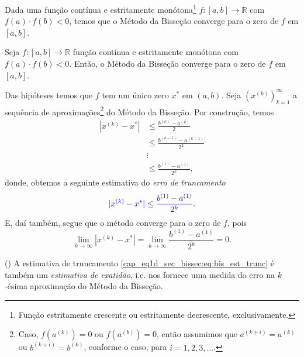 Dada uma função contínua e estritamente monótona\footnote{Função estritamente crescente ou estritamente decrescente, exclusivamente.} $f:[a, b]\to\mathbb{R}$ com $f(a)\cdot f(b) < 0$, temos que o Método da Bisseção converge para o zero de $f$ em $[a, b]$.

\begin{teo}\label{cap_eq1d_sec_bissec:teo:bissece}
  Seja $f:[a, b]\to\mathbb{R}$ função contínua e estritamente monótona com $f(a)\cdot f(b) < 0$. Então, o Método da Bisseção converge para o zero de $f$ em $[a, b]$.
\end{teo}
\begin{dem}
  Das hipóteses temos que $f$ tem um único zero $x^*$ em $(a, b)$. Seja $(x^{(k)})_{k=1}^\infty$ a sequência de aproximações\footnote{Caso, $f\left(a^{(k)}\right)=0$ ou $f\left(a^{(b)}\right)=0$, então assumimos que $a^{(k+i)} = a^{(k)}$ ou $b^{(k+i)} = b^{(k)}$, conforme o caso, para $i=1,2,3,\ldots$.} do Método da Bisseção. Por construção, temos
  \begin{align}
    |x^{(k)} - x^{*}| &\leq \frac{b^{(k)}-a^{(k)}}{2}\\
                      &\leq \frac{b^{(k-1)}-a^{(k-1)}}{2^2}\\
                      &\vdots \\
                      &\leq \frac{b^{(1)}-a^{(1)}}{2^k},
  \end{align}
  donde, obtemos a seguinte estimativa do \emph{erro de truncamento}
  \begin{equation}\label{cap_eq1d_sec_bissec:eq:bis_est_trunc}
    {\color{blue}|x^{(k)} - x^{*}| \leq \frac{b^{(1)}-a^{(1)}}{2^k}}.
  \end{equation}
  E, daí também, segue que o método converge para o zero de $f$, pois
  \begin{equation}
    \lim_{k\to\infty} |x^{(k)}-x^{*}| = \lim_{k\to\infty} \frac{b^{(1)}-a^{(1)}}{2^k} = 0.
  \end{equation}
\end{dem}

\begin{obs}()
  A estimativa de truncamento \ref{cap_eq1d_sec_bissec:eq:bis_est_trunc} é também um \emph{estimativa de exatidão}, i.e. nos fornece uma medida do erro na $k$-ésima aproximação do Método da Bisseção.
\end{obs}

